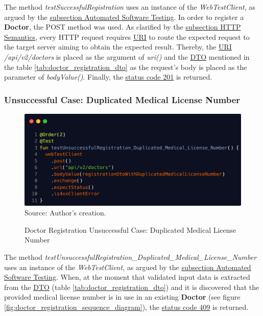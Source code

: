 The method \textit{testSuccessfulRegistration} uses an instance of the \textit{WebTestClient}, as argued by the \hyperref[subsection:automated_software_testing]{subsection Automated Software Testing}. In order to register a \textbf{Doctor}, the POST method was used. As clarified by the \hyperref[subsection:http_semantics]{subsection HTTP Semantics}, every HTTP request requires \hyperref[appendix:glossary]{URI} to route the expected request to the target server aiming to obtain the expected result. Thereby, the \hyperref[appendix:glossary]{URI} \textit{/api/v2/doctors} is placed as the argument of \textit{uri()} and the \hyperref[appendix:glossary]{DTO} mentioned in the table \ref{tab:doctor_registration_dto} as the request's body is placed as the parameter of \textit{bodyValue()}. Finally, the \hyperref[tab:summary_http_status_codes]{status code 201} is returned.

\subsubsection{Unsuccessful Case: Duplicated Medical License Number}

\begin{figure}[H]
	\centering
	\caption{Doctor Registration Unsuccessful Case: Duplicated Medical License Number}
	\includegraphics[width=1\linewidth]{figures/doctor_registration_unsucessful_integration_test_duplicated_mln.png}
	\\ \footnotesize Source: Author's creation.
	\label{fig:doctor_registration_unsucessful_integration_test_duplicated_mln}
\end{figure}

The method \textit{testUnsuccessfulRegistration\_Duplicated\_Medical\_License\_Number} uses an instance of the \textit{WebTestClient}, as argued by the \hyperref[subsection:automated_software_testing]{subsection Automated Software Testing}. When, at the moment that validated input data is extracted from the \hyperref[appendix:glossary]{DTO} (table \ref{tab:doctor_registration_dto}) and it is discovered that the provided medical license number is in use in an existing \textbf{Doctor} (see figure \ref{fig:doctor_registration_sequence_diagram}), the \hyperref[tab:summary_http_status_codes]{status code 409} is returned.


